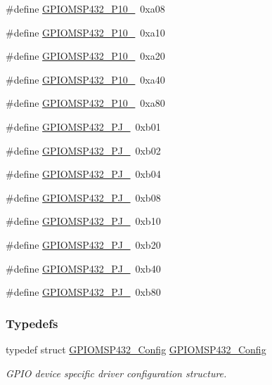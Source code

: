 \begin{DoxyCompactItemize}
\#define \hyperlink{_g_p_i_o_m_s_p432_8h_ac5ee6215cabfc0b06382b37015d8dc05}{G\+P\+I\+O\+M\+S\+P432\+\_\+\+P10\+\_}~0xa08
\item 
\#define \hyperlink{_g_p_i_o_m_s_p432_8h_a1e5a3444aa62577b543aa055ee8e2a12}{G\+P\+I\+O\+M\+S\+P432\+\_\+\+P10\+\_}~0xa10
\item 
\#define \hyperlink{_g_p_i_o_m_s_p432_8h_a3887e9a96ce5c9562d42455f3424b97c}{G\+P\+I\+O\+M\+S\+P432\+\_\+\+P10\+\_}~0xa20
\item 
\#define \hyperlink{_g_p_i_o_m_s_p432_8h_ad5140d96d5a6351235d8d25bae6132e9}{G\+P\+I\+O\+M\+S\+P432\+\_\+\+P10\+\_}~0xa40
\item 
\#define \hyperlink{_g_p_i_o_m_s_p432_8h_a9abbcbcb710f4d32fe8ad1e0580c676a}{G\+P\+I\+O\+M\+S\+P432\+\_\+\+P10\+\_}~0xa80
\item 
\#define \hyperlink{_g_p_i_o_m_s_p432_8h_ae1d946fb5c2d14f924ca51b3e3c35e49}{G\+P\+I\+O\+M\+S\+P432\+\_\+\+P\+J\+\_}~0xb01
\item 
\#define \hyperlink{_g_p_i_o_m_s_p432_8h_aa66db4973fe9fc9c1e31a34707a9cf22}{G\+P\+I\+O\+M\+S\+P432\+\_\+\+P\+J\+\_}~0xb02
\item 
\#define \hyperlink{_g_p_i_o_m_s_p432_8h_ab6d7ff7c11e68462ee7f4f391545d253}{G\+P\+I\+O\+M\+S\+P432\+\_\+\+P\+J\+\_}~0xb04
\item 
\#define \hyperlink{_g_p_i_o_m_s_p432_8h_aac3b3eb6ca43031c592ac9f6f719b08f}{G\+P\+I\+O\+M\+S\+P432\+\_\+\+P\+J\+\_}~0xb08
\item 
\#define \hyperlink{_g_p_i_o_m_s_p432_8h_a20c7586376647ea8e1a10c93086abba8}{G\+P\+I\+O\+M\+S\+P432\+\_\+\+P\+J\+\_}~0xb10
\item 
\#define \hyperlink{_g_p_i_o_m_s_p432_8h_a5402c475193dd4e2466cfb0d83dc8b30}{G\+P\+I\+O\+M\+S\+P432\+\_\+\+P\+J\+\_}~0xb20
\item 
\#define \hyperlink{_g_p_i_o_m_s_p432_8h_afa288aab6494b39b2d67031f82a485f5}{G\+P\+I\+O\+M\+S\+P432\+\_\+\+P\+J\+\_}~0xb40
\item 
\#define \hyperlink{_g_p_i_o_m_s_p432_8h_a46f1559181588d77269c10a72ffbf294}{G\+P\+I\+O\+M\+S\+P432\+\_\+\+P\+J\+\_}~0xb80
\end{DoxyCompactItemize}
\subsubsection*{Typedefs}
\begin{DoxyCompactItemize}
\item 
typedef struct \hyperlink{struct_g_p_i_o_m_s_p432___config}{G\+P\+I\+O\+M\+S\+P432\+\_\+\+Config} \hyperlink{_g_p_i_o_m_s_p432_8h_a3fa6ee35bdd2b284677c9e839a7a4c85}{G\+P\+I\+O\+M\+S\+P432\+\_\+\+Config}
\begin{DoxyCompactList}\small\item\em G\+P\+I\+O device specific driver configuration structure. \end{DoxyCompactList}\end{DoxyCompactItemize}


